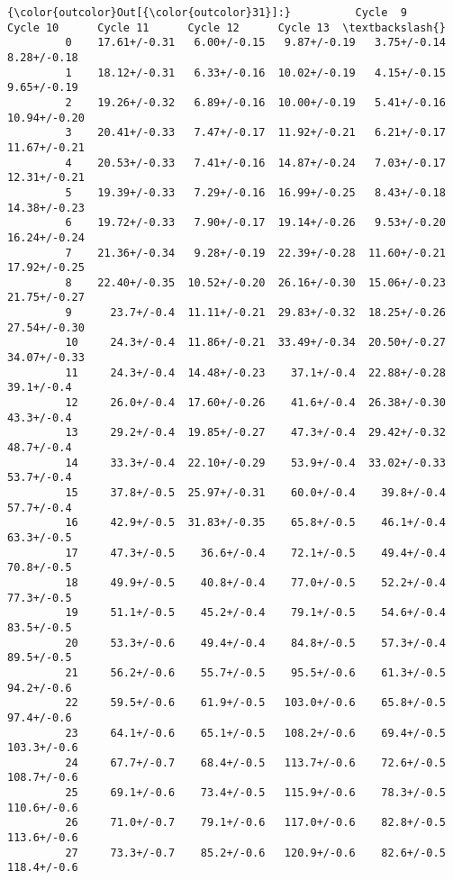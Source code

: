 \documentclass[11pt]{article}
\begin{document}
\begin{Verbatim}[commandchars=\\\{\}]
{\color{outcolor}Out[{\color{outcolor}31}]:}          Cycle  9      Cycle 10      Cycle 11      Cycle 12      Cycle 13  \textbackslash{}
         0    17.61+/-0.31   6.00+/-0.15   9.87+/-0.19   3.75+/-0.14   8.28+/-0.18   
         1    18.12+/-0.31   6.33+/-0.16  10.02+/-0.19   4.15+/-0.15   9.65+/-0.19   
         2    19.26+/-0.32   6.89+/-0.16  10.00+/-0.19   5.41+/-0.16  10.94+/-0.20   
         3    20.41+/-0.33   7.47+/-0.17  11.92+/-0.21   6.21+/-0.17  11.67+/-0.21   
         4    20.53+/-0.33   7.41+/-0.16  14.87+/-0.24   7.03+/-0.17  12.31+/-0.21   
         5    19.39+/-0.33   7.29+/-0.16  16.99+/-0.25   8.43+/-0.18  14.38+/-0.23   
         6    19.72+/-0.33   7.90+/-0.17  19.14+/-0.26   9.53+/-0.20  16.24+/-0.24   
         7    21.36+/-0.34   9.28+/-0.19  22.39+/-0.28  11.60+/-0.21  17.92+/-0.25   
         8    22.40+/-0.35  10.52+/-0.20  26.16+/-0.30  15.06+/-0.23  21.75+/-0.27   
         9      23.7+/-0.4  11.11+/-0.21  29.83+/-0.32  18.25+/-0.26  27.54+/-0.30   
         10     24.3+/-0.4  11.86+/-0.21  33.49+/-0.34  20.50+/-0.27  34.07+/-0.33   
         11     24.3+/-0.4  14.48+/-0.23    37.1+/-0.4  22.88+/-0.28    39.1+/-0.4   
         12     26.0+/-0.4  17.60+/-0.26    41.6+/-0.4  26.38+/-0.30    43.3+/-0.4   
         13     29.2+/-0.4  19.85+/-0.27    47.3+/-0.4  29.42+/-0.32    48.7+/-0.4   
         14     33.3+/-0.4  22.10+/-0.29    53.9+/-0.4  33.02+/-0.33    53.7+/-0.4   
         15     37.8+/-0.5  25.97+/-0.31    60.0+/-0.4    39.8+/-0.4    57.7+/-0.4   
         16     42.9+/-0.5  31.83+/-0.35    65.8+/-0.5    46.1+/-0.4    63.3+/-0.5   
         17     47.3+/-0.5    36.6+/-0.4    72.1+/-0.5    49.4+/-0.4    70.8+/-0.5   
         18     49.9+/-0.5    40.8+/-0.4    77.0+/-0.5    52.2+/-0.4    77.3+/-0.5   
         19     51.1+/-0.5    45.2+/-0.4    79.1+/-0.5    54.6+/-0.4    83.5+/-0.5   
         20     53.3+/-0.6    49.4+/-0.4    84.8+/-0.5    57.3+/-0.4    89.5+/-0.5   
         21     56.2+/-0.6    55.7+/-0.5    95.5+/-0.6    61.3+/-0.5    94.2+/-0.6   
         22     59.5+/-0.6    61.9+/-0.5   103.0+/-0.6    65.8+/-0.5    97.4+/-0.6   
         23     64.1+/-0.6    65.1+/-0.5   108.2+/-0.6    69.4+/-0.5   103.3+/-0.6   
         24     67.7+/-0.7    68.4+/-0.5   113.7+/-0.6    72.6+/-0.5   108.7+/-0.6   
         25     69.1+/-0.6    73.4+/-0.5   115.9+/-0.6    78.3+/-0.5   110.6+/-0.6   
         26     71.0+/-0.7    79.1+/-0.6   117.0+/-0.6    82.8+/-0.5   113.6+/-0.6   
         27     73.3+/-0.7    85.2+/-0.6   120.9+/-0.6    82.6+/-0.5   118.4+/-0.6   

\end{Verbatim}
\end{document}
